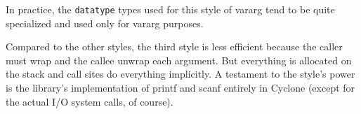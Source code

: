 In practice, the \texttt{datatype} types used for this style of vararg
tend to be quite specialized and used only for vararg purposes.

Compared to the other styles, the third style is less efficient
because the caller must wrap and the callee unwrap each argument.  But
everything is allocated on the stack and call sites do everything
implicitly.  A testament to the style's power is the library's
implementation of printf and scanf entirely in Cyclone (except for the
actual I/O system calls, of course).

